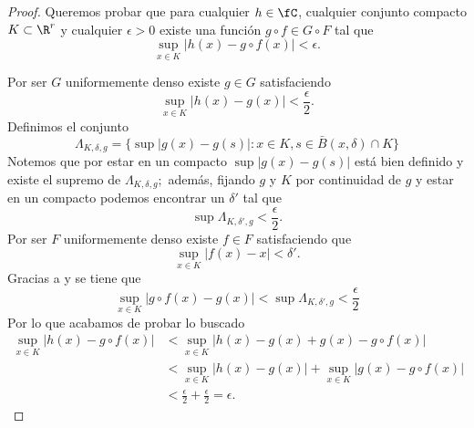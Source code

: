\begin{proof}
    Queremos probar que para cualquier $h \in \fC$, cualquier conjunto compacto $K \subset \R^r$ 
    y cualquier $\epsilon >0$
    existe una función $g \circ f \in G \circ F$ tal que 
    \begin{equation}
        \sup_{x \in K}|h(x) - g \circ f(x)| < \epsilon.
    \end{equation}

    Por ser $G$ uniformemente denso existe $g \in G$ satisfaciendo 
    \begin{equation}
        \sup_{x \in K}|h(x) - g(x)| < \frac{\epsilon}{2}.
    \end{equation}
    Definimos el conjunto 
    \begin{equation}
        \Lambda_{K, \delta, g} 
        = 
        \{
           \sup|g(x) - g(s)| : x \in K, s \in \bar{B}(x,\delta) \cap K 
        \}
    \end{equation}
    Notemos que por estar en un compacto $\sup|g(x) - g(s)|$ está bien definido 
    y existe el supremo de $\Lambda_{K, \delta, g};$ además, fijando $g$ y $K$ por continuidad de $g$
    y estar en un compacto podemos encontrar un $\delta'$ tal que 
    \begin{equation}\label{lema_A_6:supremo_lambda_delta_prima}
        \sup \Lambda_{K, \delta', g}  < \frac{\epsilon}{2}.
    \end{equation}
    Por ser $F$ uniformemente denso existe $f \in F$ satisfaciendo 
    que 
    \begin{equation}\label{lema_A_6:encontramos_f}
        \sup_{x \in K}|f(x) - x| < \delta'.
    \end{equation}
    Gracias a  y  se tiene que
    \begin{equation}
        \sup_{x \in K}|g \circ f(x) - g(x)| 
        < \sup \Lambda_{K, \delta', g} 
        < \frac{\epsilon}{2}
    \end{equation}
    Por lo que acabamos de probar lo buscado 
    \begin{align}
        \sup_{x \in K}|h(x) - g \circ f(x)| &
        < 
        \sup_{x \in K}|h(x) - g(x) + g(x) - g \circ f(x)| 
        \\ &
        < 
        \sup_{x \in K}|h(x) - g(x)|
        + 
        \sup_{x \in K}|g(x) - g \circ f(x)|  
        \\ &
        < 
        \frac{\epsilon}{2} + \frac{\epsilon}{2}
        = \epsilon.
    \end{align}
\end{proof}

